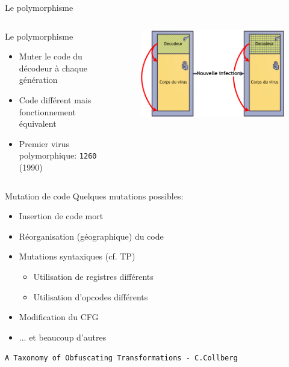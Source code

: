 \documentclass{beamer}
\begin{document}
\begin{frame}{Le polymorphisme}
\begin{columns}[t]
\begin{column}{5cm}
\begin{exampleblock}{Le polymorphisme}
\begin{itemize}
\item Muter le code du décodeur à chaque génération
\item Code différent mais fonctionnement équivalent
\item Premier virus polymorphique: \texttt{1260} (1990)
\end{itemize}
\end{exampleblock}
\end{column}
\begin{column}{5cm}
\begin{figure}[!ht]
\includegraphics[scale=0.31]{poly.png}
\center
\end{figure}
\end{column}
\end{columns}
\end{frame}

\begin{frame}{Mutation de code}
Quelques mutations possibles:
\begin{itemize}
\item Insertion de code mort
\item Réorganisation (géographique) du code
\item Mutations syntaxiques (cf. TP)
\begin{itemize}
\item Utilisation de registres différents
\item Utilisation d'opcodes différents
\end{itemize}
\item Modification du CFG
\item ... et beaucoup d'autres
\end{itemize}
\begin{exampleblock}{}
\texttt{A Taxonomy of Obfuscating Transformations - C.Collberg}
\end{exampleblock}
\end{frame}
\end{document}
